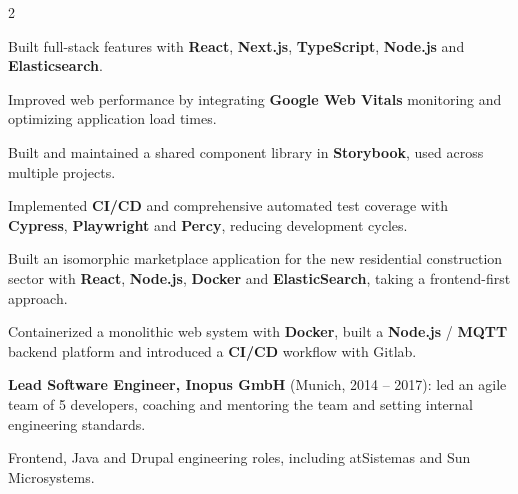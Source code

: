 \documentclass[]{main}
\begin{document}
\begin{paracol}{2}
\begin{tightemize}
    \item Built full-stack features with \textbf{React}, \textbf{Next.js}, \textbf{TypeScript}, \textbf{Node.js} and \textbf{Elasticsearch}.
    \item Improved web performance by integrating \textbf{Google Web Vitals} monitoring and optimizing application load times.
    \item Built and maintained a shared component library in \textbf{Storybook}, used across multiple projects.
    \item Implemented \textbf{CI/CD} and comprehensive automated test coverage with \textbf{Cypress}, \textbf{Playwright} and \textbf{Percy}, reducing development cycles.
\end{tightemize}
\sectionsep

\begin{tightemize}
    \item Built an isomorphic marketplace application for the new residential construction sector with \textbf{React}, \textbf{Node.js}, \textbf{Docker} and \textbf{ElasticSearch}, taking a frontend-first approach.
\end{tightemize}
\sectionsep

\begin{tightemize}
    \item Containerized a monolithic web system with \textbf{Docker}, built a \textbf{Node.js} / \textbf{MQTT} backend platform and introduced a \textbf{CI/CD} workflow with Gitlab.
\end{tightemize}
\sectionsep

\begin{tightemize}
    \item \textbf{Lead Software Engineer, Inopus GmbH} (Munich, 2014 – 2017): led an agile team of 5 developers, coaching and mentoring the team and setting internal engineering standards.
    \item Frontend, Java and Drupal engineering roles, including atSistemas and Sun Microsystems.
\end{tightemize}
\sectionsep


\end{paracol}
\end{document}
